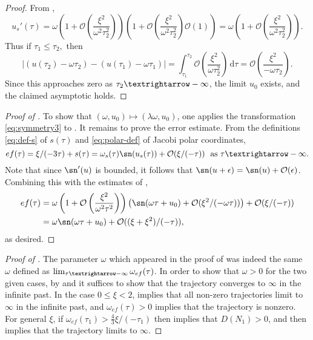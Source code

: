 \begin{proof}
From , 
\[
u_{s}'(\tau)=\omega\left(1+\mathcal{O}\left(\frac{\xi^{2}}{\omega^{2}\tau_{2}^{2}}\right)\right)\left(1+\mathcal{O}\left(\frac{\xi^{2}}{\omega^{2}\tau_{2}^{2}}\right)\mathcal{O}\left(1\right)\right)=\omega\left(1+\mathcal{O}\left(\frac{\xi^{2}}{\omega^{2}\tau_{2}^{2}}\right)\right).
\]
 Thus if $\tau_{1}\leq\tau_{2},$ then 
\[
\left|(u(\tau_{2})-\omega\tau_{2})-(u(\tau_{1})-\omega\tau_{1})\right|=\int_{\tau_{1}}^{\tau_{2}}\mathcal{O}\left(\frac{\xi^{2}}{\omega\tau_{2}^{2}}\right)\,\mathrm{d}\tau=\mathcal{O}\left(\frac{\xi^{2}}{-\omega\tau_{2}}\right).
\]
 Since this approaches zero as $\tau_{2}\textrightarrow-\infty$, the limit $u_{0}$ exists, and the claimed asymptotic holds.  
\end{proof}
%
\begin{proof}[Proof of ]
\label{pf:oscillatory} To show that $(\omega,u_{0})\mapsto(\lambda\omega,u_{0})$, one applies the transformation \eqref{eq:symmetry3} to . It remains to prove the error estimate. From the definitions \eqref{eq:def-s} of $s(\tau)$ and \eqref{eq:polar-def} of Jacobi polar coordinates, 
\[
ef(\tau)=\xi/(-3\tau)+s(\tau)=\omega_{s}(\tau)\sn(u_{s}(\tau))+\mathcal{O}(\xi/(-\tau))\ \textrm{ as }\tau\textrightarrow-\infty.
\]
 Note that since $\sn'(u)$ is bounded, it follows that $\sn(u+\epsilon)=\sn(u)+\mathcal{O}(\epsilon)$. Combining this with the estimates of , 
\begin{align*}
ef(\tau) & =\omega\left(1+\mathcal{O}\left(\frac{\xi^{2}}{\omega^{2}\tau^{2}}\right)\right)\left(\sn(\omega\tau+u_{0})+\mathcal{O}(\xi^{2}/(-\omega\tau))\right)+\mathcal{O}(\xi/(-\tau))\\
 & =\omega\sn(\omega\tau+u_{0})+\mathcal{O}((\xi+\xi^{2})/(-\tau)),
\end{align*}
 as desired. 
\end{proof}
%
\begin{proof}[Proof of ]
\label{pf:approx-w} The parameter $\omega$ which appeared in the proof of  was indeed the same $\omega$ defined as $\lim_{\tau\textrightarrow-\infty}\omega_{ef}(\tau)$. In order to show that $\omega>0$ for the two given cases, by  and  it suffices to show that the trajectory converges to $\bm{\infty}$ in the infinite past. In the case $0\leq\xi<2$,  implies that all non-zero trajectories limit to $\bm{\infty}$ in the infinite past, and $\omega_{ef}(\tau)>0$ implies that the trajectory is nonzero. For general $\xi$, if $\omega_{ef}(\tau_{1})>\tfrac{4}{3}\xi/(-\tau_{1})$ then  implies that $D(N_{1})>0$, and then  implies that the trajectory limits to $\bm{\infty}$. 
\end{proof}

